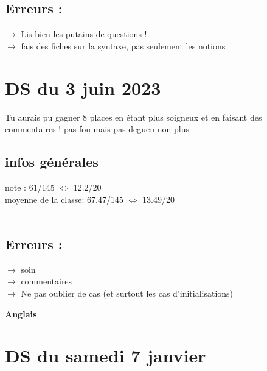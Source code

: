 \documentclass{book}
\begin{document}
\subsection{Erreurs :}

$\rightarrow$ Lis bien les putains de questions ! \\
$\rightarrow$ fais des fiches sur la syntaxe, pas seulement les notions \\


\section{DS du 3 juin 2023}

\begin{tcolorbox}[width={14cm},colback={yellow!20!white},title={\textbf{Commentaire générale sur ce DS}},colbacktitle=red!40!white,coltitle=black]
	Tu aurais pu gagner 8 places en étant plus soigneux et en faisant des commentaires ! pas fou mais pas degueu non plus
\end{tcolorbox}

\subsection{infos générales}

note : 61/145 $\Leftrightarrow$ 12.2/20 \\
moyenne de la classe: 67.47/145 $\Leftrightarrow$ 13.49/20 \\ \\

\subsection{Erreurs :}

$\rightarrow$ soin \\
$\rightarrow$ commentaires\\
$\rightarrow$ Ne pas oublier de cas (et surtout les cas d'initialisations) \\






\begin{center}
\textbf{\large Anglais}
\end{center}

\vspace{0.6cm}

\section{DS du samedi 7 janvier}
\end{document}
